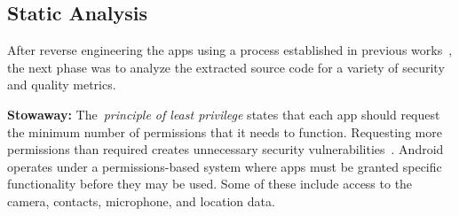 \documentclass{sig-alternate-05-2015}
\begin{document}
%
%
%
%
%
%
%
%
%




\subsection{Static Analysis}

After reverse engineering the apps using a process established in previous works~\cite{Lee_2013,6687155}, the next phase was to analyze the extracted source code for a variety of security and quality metrics.


\textbf{Stowaway\cite{Felt:2011:APD:2046707.2046779}:} The~\emph{principle of least privilege} states that each app should request the minimum number of permissions that it needs to function. Requesting more permissions than required creates unnecessary security vulnerabilities~\cite{saltzer1975protection}. Android operates under a permissions-based system where apps must be granted specific functionality before they may be used. Some of these include access to the camera, contacts, microphone, and location data.
\end{document}
